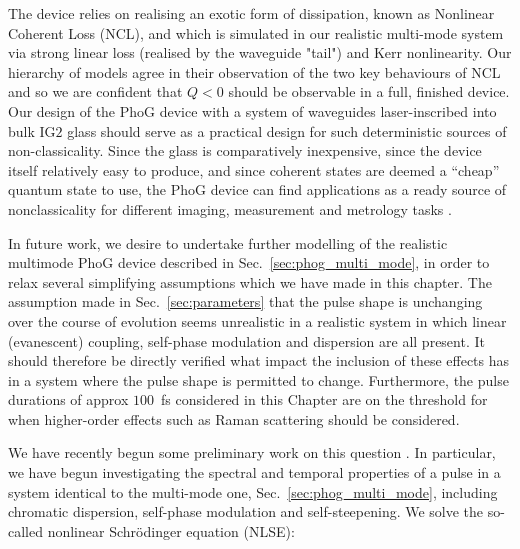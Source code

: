 The device relies on realising an exotic form of dissipation, known as Nonlinear Coherent Loss (NCL), and which is simulated in our realistic multi-mode system via strong linear loss (realised by the waveguide "tail") and Kerr nonlinearity. Our hierarchy of models agree in their observation of the two key behaviours of NCL and so we are confident that $Q < 0$ should be observable in a full, finished device. Our design of the PhoG device with a system of waveguides laser-inscribed into bulk IG$2$ glass should serve as a practical design for such deterministic sources of non-classicality. Since the glass is comparatively inexpensive, since the device itself relatively easy to produce, and since coherent states are deemed a ``cheap'' quantum state to use, the PhoG device can find applications as a ready source of nonclassicality for different imaging, measurement and metrology tasks \cite{Taylor2013, Berchera2019}. %

In future work, we desire to undertake further modelling of the realistic multimode PhoG device described in Sec.~\ref{sec:phog_multi_mode}, in order to relax several simplifying assumptions which we have made in this chapter. The assumption made in Sec.~\ref{sec:parameters} that the pulse shape is unchanging over the course of evolution seems unrealistic in a realistic system in which linear (evanescent) coupling, self-phase modulation and dispersion are all present. It should therefore be directly verified what impact the inclusion of these effects has in a system where the pulse shape is permitted to change. Furthermore, the pulse durations of approx $100$~fs considered in this Chapter are on the threshold for when higher-order effects such as Raman scattering should be considered.

We have recently begun some preliminary work on this question%
. In particular, we have begun investigating the spectral and temporal properties of a pulse in a system identical to the multi-mode one, Sec.~\ref{sec:phog_multi_mode}, including chromatic dispersion, self-phase modulation and self-steepening. We solve the so-called nonlinear Schr{\"o}dinger equation (NLSE):

